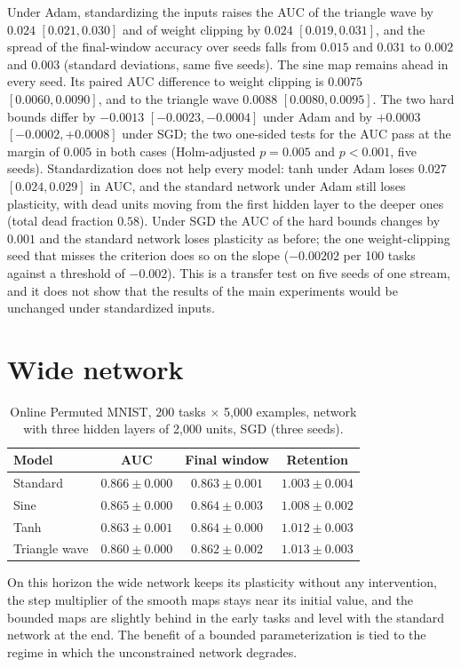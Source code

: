 \documentclass[11pt,a4paper]{article}
\begin{document}
Under Adam, standardizing the inputs raises the AUC of the triangle wave by $0.024$ $[0.021,0.030]$ and of
weight clipping by $0.024$ $[0.019,0.031]$, and the spread of the final-window accuracy over seeds falls from
$0.015$ and $0.031$ to $0.002$ and $0.003$ (standard deviations, same five seeds). The sine map remains ahead in
every seed. Its paired AUC difference to weight clipping is $0.0075$ $[0.0060,0.0090]$, and to the
triangle wave $0.0088$ $[0.0080,0.0095]$. The two hard bounds differ by $-0.0013$ $[-0.0023,-0.0004]$ under Adam and by $+0.0003$
$[-0.0002,+0.0008]$ under SGD; the two one-sided tests for the AUC pass at the margin of $0.005$ in both cases
(Holm-adjusted $p=0.005$ and $p<0.001$, five seeds). Standardization does not help every model: tanh under Adam loses $0.027$
$[0.024,0.029]$ in AUC, and the standard network under Adam still loses plasticity, with dead units moving
from the first hidden layer to the deeper ones (total dead fraction $0.58$). Under SGD the AUC of the hard
bounds changes by $0.001$ and the standard network loses plasticity as before; the one weight-clipping seed
that misses the criterion does so on the slope ($-0.00202$ per 100 tasks against a threshold of $-0.002$).
This is a transfer test on five seeds of one stream, and it does not show that the results of the main
experiments would be unchanged under standardized inputs.

\section{Wide network}\label{app:wide}

\begin{table}[h]
  \centering\small
  \caption{Online Permuted MNIST, 200 tasks $\times$ 5{,}000 examples, network with three hidden layers of
  2{,}000 units, SGD (three seeds).}
  \label{tab:wide}
  \begin{tabular}{@{}lccc@{}}
    \toprule
    Model & AUC & Final window & Retention\\
    \midrule
    Standard      & $0.866\pm0.000$ & $0.863\pm0.001$ & $1.003\pm0.004$\\
    Sine          & $0.865\pm0.000$ & $0.864\pm0.003$ & $1.008\pm0.002$\\
    Tanh          & $0.863\pm0.001$ & $0.864\pm0.000$ & $1.012\pm0.003$\\
    Triangle wave & $0.860\pm0.000$ & $0.862\pm0.002$ & $1.013\pm0.003$\\
    \bottomrule
  \end{tabular}
\end{table}

On this horizon the wide network keeps its plasticity without any intervention, the step multiplier of the
smooth maps stays near its initial value, and the bounded maps are slightly behind in the early tasks and
level with the standard network at the end. The benefit of a bounded parameterization is tied to the regime
in which the unconstrained network degrades.
\end{document}
